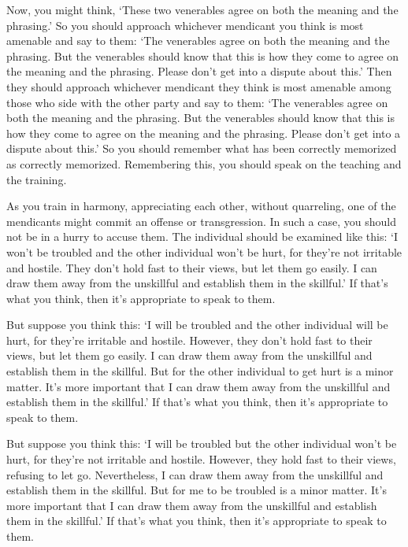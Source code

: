 \documentclass[12pt,openany]{book}%
\begin{document}
Now, you might think, ‘These two venerables agree on both the meaning and the phrasing.’ So you should approach whichever mendicant you think is most amenable and say to them: ‘The venerables agree on both the meaning and the phrasing. But the venerables should know that this is how they come to agree on the meaning and the phrasing. Please don’t get into a dispute about this.’ Then they should approach whichever mendicant they think is most amenable among those who side with the other party and say to them: ‘The venerables agree on both the meaning and the phrasing. But the venerables should know that this is how they come to agree on the meaning and the phrasing. Please don’t get into a dispute about this.’ So you should remember what has been correctly memorized as correctly memorized. Remembering this, you should speak on the teaching and the training. 

As you train in harmony, appreciating each other, without quarreling, one of the mendicants might commit an offense or transgression. In such a case, you should not be in a hurry to accuse them. The individual should be examined like this: ‘I won’t be troubled and the other individual won’t be hurt, for they’re not irritable and hostile. They don’t hold fast to their views, but let them go easily. I can draw them away from the unskillful and establish them in the skillful.’ If that’s what you think, then it’s appropriate to speak to them. 

But suppose you think this: ‘I will be troubled and the other individual will be hurt, for they’re irritable and hostile. However, they don’t hold fast to their views, but let them go easily. I can draw them away from the unskillful and establish them in the skillful. But for the other individual to get hurt is a minor matter. It’s more important that I can draw them away from the unskillful and establish them in the skillful.’ If that’s what you think, then it’s appropriate to speak to them. 

But suppose you think this: ‘I will be troubled but the other individual won’t be hurt, for they’re not irritable and hostile. However, they hold fast to their views, refusing to let go. Nevertheless, I can draw them away from the unskillful and establish them in the skillful. But for me to be troubled is a minor matter. It’s more important that I can draw them away from the unskillful and establish them in the skillful.’ If that’s what you think, then it’s appropriate to speak to them. 
\end{document}
